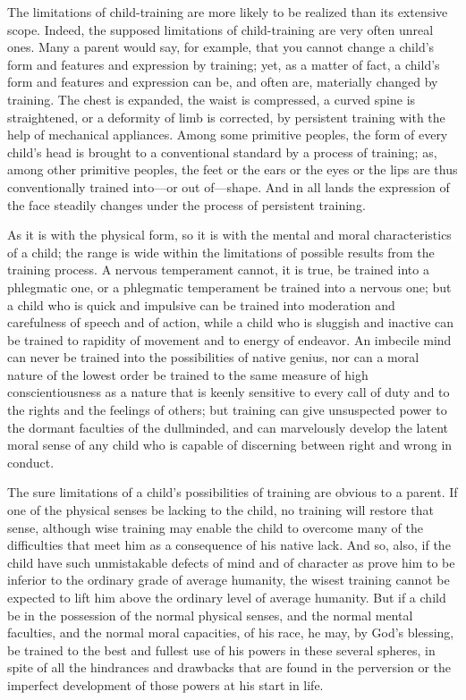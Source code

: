 \documentclass[
]{book}
\begin{document}
The limitations of child-training are more likely to be realized than its extensive scope. Indeed, the supposed limitations of child-training are very often unreal ones. Many a parent would say, for example, that you cannot change a child's form and features and expression by training; yet, as a matter of fact, a child's form and features and expression can be, and often are, materially changed by training. The chest is expanded, the waist is compressed, a curved spine is straightened, or a deformity of limb is corrected, by persistent training with the help of mechanical appliances. Among some primitive peoples, the form of every child's head is brought to a conventional standard by a process of training; as, among other primitive peoples, the feet or the ears or the eyes or the lips are thus conventionally trained into---or out of---shape. And in all lands the expression of the face steadily changes under the process of persistent training.

As it is with the physical form, so it is with the mental and moral characteristics of a child; the range is wide within the limitations of possible results from the training process. A nervous temperament cannot, it is true, be trained into a phlegmatic one, or a phlegmatic temperament be trained into a nervous one; but a child who is quick and impulsive can be trained into moderation and carefulness of speech and of action, while a child who is sluggish and inactive can be trained to rapidity of movement and to energy of endeavor. An imbecile mind can never be trained into the possibilities of native genius, nor can a moral nature of the lowest order be trained to the same measure of high conscientiousness as a nature that is keenly sensitive to every call of duty and to the rights and the feelings of others; but training can give unsuspected power to the dormant faculties of the dullminded, and can marvelously develop the latent moral sense of any child who is capable of discerning between right and wrong in conduct.

The sure limitations of a child's possibilities of training are obvious to a parent. If one of the physical senses be lacking to the child, no training will restore that sense, although wise training may enable the child to overcome many of the difficulties that meet him as a consequence of his native lack. And so, also, if the child have such unmistakable defects of mind and of character as prove him to be inferior to the ordinary grade of average humanity, the wisest training cannot be expected to lift him above the ordinary level of average humanity. But if a child be in the possession of the normal physical senses, and the normal mental faculties, and the normal moral capacities, of his race, he may, by God's blessing, be trained to the best and fullest use of his powers in these several spheres, in spite of all the hindrances and drawbacks that are found in the perversion or the imperfect development of those powers at his start in life.
\end{document}
